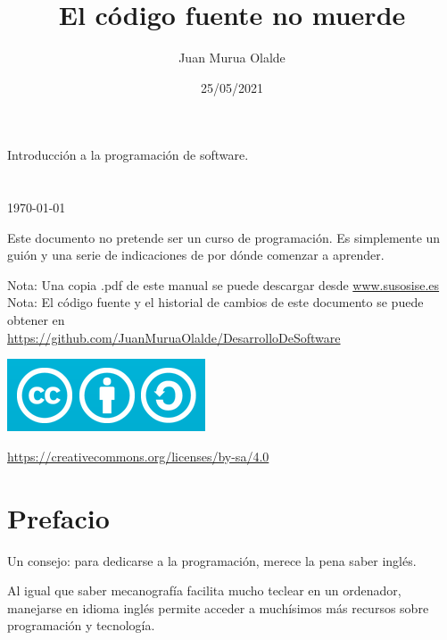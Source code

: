 \documentclass[spanish,12pt,a4paper,final,oneside]{book}
\title{El código fuente no muerde}
\author{Juan Murua Olalde}
\date{25/05/2021}
\begin{document}
\begin{titlepage}

\begin{flushright}
\vspace{2cm}
\begin{Huge}\MyTitle\end{Huge}

Introducción a la programación de software.
\\
\vspace{1cm}
\MyAuthor
\\
\vspace{1cm}
\MyDate
\\ \today
\\
\end{flushright}

\vspace{2cm}
Este documento no pretende ser un curso de programación. Es simplemente un guión y una serie de indicaciones de por dónde comenzar a aprender. 

\vfill
Nota: Una copia .pdf de este manual se puede descargar desde \url{www.susosise.es}
\\Nota: El código fuente y el historial de cambios de este documento se puede obtener en  \\ \url{https://github.com/JuanMuruaOlalde/DesarrolloDeSoftware}
\begin{flushleft}
\includegraphics[scale=0.3]{CreativeCommons-Attribution-ShareAlike-logo}
\begin{small}\url{https://creativecommons.org/licenses/by-sa/4.0}\end{small}
\end{flushleft}

\end{titlepage}

\hypersetup{linkcolor=black}
\tableofcontents


\chapter*{Prefacio}

Un consejo: para dedicarse a la programación, merece la pena saber inglés.

Al igual que saber mecanografía facilita mucho teclear en un ordenador, manejarse en idioma inglés permite acceder a muchísimos más recursos sobre programación y tecnología.
\end{document}
